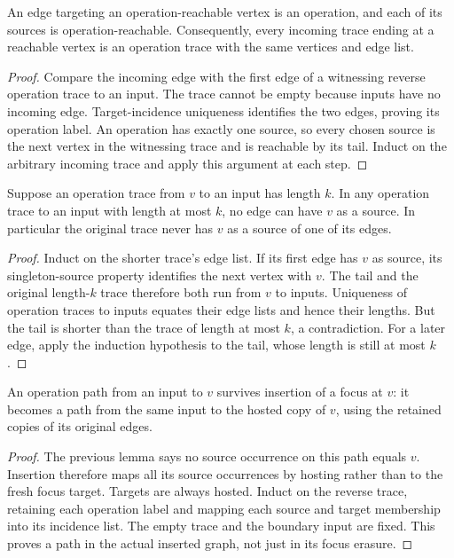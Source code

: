 \begin{lemma}
An edge targeting an operation-reachable vertex is an operation, and each of
its sources is operation-reachable. Consequently, every incoming trace ending
at a reachable vertex is an operation trace with the same vertices and edge list.
\end{lemma}
\begin{proof}
Compare the incoming edge with the first edge of a witnessing reverse
operation trace to an input. The trace cannot be empty because inputs have no
incoming edge. Target-incidence uniqueness identifies the two edges, proving
its operation label. An operation has exactly one source, so every chosen
source is the next vertex in the witnessing trace and is reachable by its tail.
Induct on the arbitrary incoming trace and apply this argument at each step.
\end{proof}

\begin{lemma}
Suppose an operation trace from $v$ to an input has length $k$. In any operation
trace to an input with length at most $k$, no edge can have $v$ as a source.
In particular the original trace never has $v$ as a source of one of its edges.
\end{lemma}
\begin{proof}
Induct on the shorter trace's edge list. If its first edge has $v$ as source,
its singleton-source property identifies the next vertex with $v$. The tail
and the original length-$k$ trace therefore both run from $v$ to inputs.
Uniqueness of operation traces to inputs equates their edge lists and hence
their lengths. But the tail is shorter than the trace of length at most $k$,
a contradiction. For a later edge, apply the induction hypothesis to the tail,
whose length is still at most $k$.
\end{proof}

\begin{theorem}
An operation path from an input to $v$ survives insertion of a focus at $v$:
it becomes a path from the same input to the hosted copy of $v$, using the
retained copies of its original edges.
\end{theorem}
\begin{proof}
The previous lemma says no source occurrence on this path equals $v$.
Insertion therefore maps all its source occurrences by hosting rather than
to the fresh focus target. Targets are always hosted. Induct on the reverse
trace, retaining each operation label and mapping each source and target
membership into its incidence list. The empty trace and the boundary input
are fixed. This proves a path in the actual inserted graph, not just in its
focus erasure.
\end{proof}


